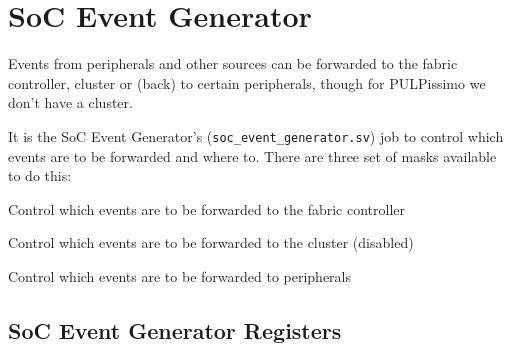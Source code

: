 \section{SoC Event Generator}

Events from peripherals and other sources can be forwarded to the
fabric controller, cluster or (back) to certain peripherals, though for
PULPissimo we don't have a cluster.

It is the SoC Event Generator's (\texttt{soc\_event\_generator.sv}) job to control which events are to be forwarded and where to.
There are three set of masks available to do this:
\begin{enumerate}[leftmargin=\widthof{[Peripheral Masks]}+\labelsep]
  \item[FC Masks] Control which events are to be forwarded to the fabric controller
  \item[Cluster Masks] Control which events are to be forwarded to the cluster (disabled)
  \item[Peripheral Masks] Control which events are to be forwarded to peripherals
\end{enumerate}



\subsection{SoC Event Generator Registers}

